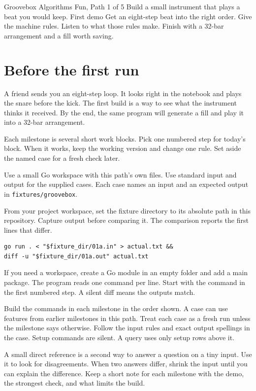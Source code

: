 \documentclass[11pt,letterpaper]{article}
\begin{document}
\coursecover
  {Groovebox}
  {Algorithms Fun, Path 1 of 5}
  {Build a small instrument that plays a beat you would keep.}
  {First demo}
  {Get an eight-step beat into the right order.}
  {Give the machine rules. Listen to what those rules make.}
  {Finish with a 32-bar arrangement and a fill worth saving.}
\tableofcontents
\clearpage
\section{Before the first run}
A friend sends you an eight-step loop. It looks right in the notebook and plays the snare before the kick. The first build is a way to see what the instrument thinks it received. By the end, the same program will generate a fill and play it into a 32-bar arrangement.

Each milestone is several short work blocks. Pick one numbered step for today's block. When it works, keep the working version and change one rule. Set aside the named case for a fresh check later.

Use a small Go workspace with this path's own files. Use standard input and output for the supplied cases. Each case names an input and an expected output in \texttt{fixtures/groovebox}.

From your project workspace, set the fixture directory to its absolute path in this repository. Capture output before comparing it. The comparison reports the first lines that differ.
\begin{samepage}
\small
\begin{verbatim}
go run . < "$fixture_dir/01a.in" > actual.txt &&
diff -u "$fixture_dir/01a.out" actual.txt
\end{verbatim}
\end{samepage}

If you need a workspace, create a Go module in an empty folder and add a main package. The program reads one command per line. Start with the command in the first numbered step. A silent diff means the outputs match.

Build the commands in each milestone in the order shown. A case can use features from earlier milestones in this path. Treat each case as a fresh run unless the milestone says otherwise. Follow the input rules and exact output spellings in the case. Setup commands are silent. A query uses only setup rows above it.

A small direct reference is a second way to answer a question on a tiny input. Use it to look for disagreements. When two answers differ, shrink the input until you can explain the difference. Keep a short note for each milestone with the demo, the strongest check, and what limits the build.
\end{document}
